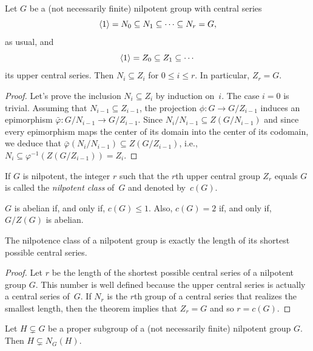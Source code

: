 \begin{thm}
    Let\/ $G$ be a (not necessarily finite) nilpotent group with central series
    $$
        \langle1\rangle = N_0 \subseteq N_1 \subseteq \cdots \subseteq N_r = G,
    $$
    as usual, and
    $$
        \langle1\rangle = Z_0 \subseteq Z_1 \subseteq \cdots
    $$
    its upper central series. Then $N_i \subseteq Z_i$ for $0\le i\le r$. In particular, $Z_r = G$.
\end{thm}

\begin{proof} Let's prove the inclusion $N_i\subseteq Z_i$ by induction on~$i$. The case $i=0$ is trivial. Assuming that $N_{i-1}\subseteq Z_{i-1}$, the projection $\phi\colon G\to G/Z_{i-1}$ induces an epimorphism $\bar\varphi\colon G/N_{i-1}\to G/Z_{i-1}$. Since $N_i/N_{i-1}\subseteq Z(G/N_{i-1})$ and since every epimorphism maps the center of its domain into the center of its codomain, we deduce that $\bar\varphi(N_i/N_{i-1})\subseteq Z(G/Z_{i-1})$, i.e., $N_i\subseteq\varphi^{-1}(Z(G/Z_{i-1}))=Z_i$.  \end{proof}

\begin{defn}
    If\/ $G$ is nilpotent, the integer $r$ such that the $r$th upper central group $Z_r$ equals $G$ is called the \textsl{nilpotent class} of\/~$G$ and denoted by~$c(G)$.
\end{defn}

\begin{rem}
    $G$ is abelian if, and only if, $c(G)\le1$. Also, $c(G)=2$ if, and only if, $G/Z(G)$ is abelian.
\end{rem}

\begin{cor}
    The nilpotence class of a nilpotent group is exactly the length of its shortest possible central series.
\end{cor}

\begin{proof} Let $r$ be the length of the shortest possible central series of a nilpotent group $G$. This number is well defined because the upper central series is actually a central series of~$G$. If $N_r$ is the $r$th group of a central series that realizes the smallest length, then the theorem implies that $Z_r=G$ and so $r=c(G)$.  \end{proof}

\begin{thm}\label{normalizers-grow}
    Let\/ $H\varsubsetneq G$ be a proper subgroup of a (not necessarily finite) nilpotent group\/ $G$. Then\/ $H\varsubsetneq N_G(H)$.
\end{thm}

